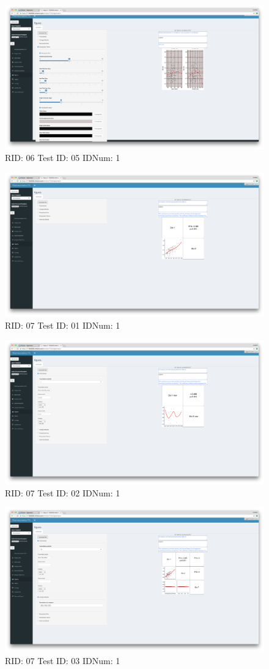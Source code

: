\begin{figure}[H]
\includegraphics[width=.8\textwidth]{screencaps/06-05-1.png}
\caption{RID: 06 Test ID: 05 IDNum: 1}
\end{figure}
\begin{figure}[H]
\includegraphics[width=.8\textwidth]{screencaps/07-01-1.png}
\caption{RID: 07 Test ID: 01 IDNum: 1}
\end{figure}
\begin{figure}[H]
\includegraphics[width=.8\textwidth]{screencaps/07-02-1.png}
\caption{RID: 07 Test ID: 02 IDNum: 1}
\end{figure}
\begin{figure}[H]
\includegraphics[width=.8\textwidth]{screencaps/07-03-1.png}
\caption{RID: 07 Test ID: 03 IDNum: 1}
\end{figure}
